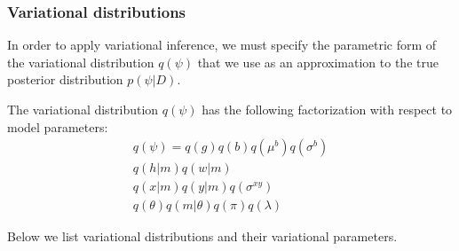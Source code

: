 \subsubsection*{Variational distributions}

In order to apply variational inference, we must specify the parametric form of the variational distribution $q(\psi)$
that we use as an approximation to the true posterior distribution $p(\psi | D)$.

The variational distribution $q(\psi)$ has the following factorization with respect to model parameters:
%
\begin{gather*}
    q(\psi) = q(g) q(b) q(\mu^b) q(\sigma^b) \\
    q(h | m) q(w | m) \\
    q(x | m) q(y | m) q(\sigma^{xy}) \\
    q(\theta) q(m | \theta) q(\pi) q(\lambda)
\end{gather*}

Below we list variational distributions and their variational parameters.

